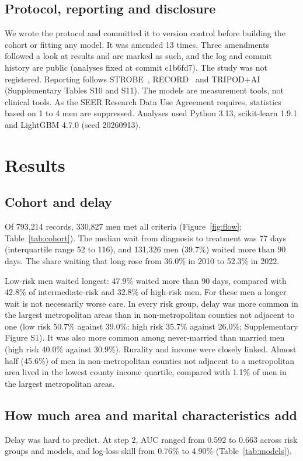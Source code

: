 \documentclass[10pt,a4paper,twocolumn]{article}
\begin{document}
\subsection{Protocol, reporting and disclosure}
We wrote the protocol and committed it to version control before building the cohort or fitting any model. It was amended 13 times. Three amendments followed a look at results and are marked as such, and the log and commit history are public (analyses fixed at commit c1b6fd7). The study was not registered. Reporting follows STROBE~\cite{strobe2007}, RECORD~\cite{record2015} and TRIPOD+AI~\cite{tripodai2024} (Supplementary Tables S10 and S11). The models are measurement tools, not clinical tools. As the SEER Research Data Use Agreement requires, statistics based on 1 to 4 men are suppressed. Analyses used Python 3.13, scikit-learn 1.9.1 and LightGBM 4.7.0 (seed 20260913).

\section{Results}

\subsection{Cohort and delay}
Of 793,214 records, 330,827 men met all criteria (Figure~\ref{fig:flow}; Table~\ref{tab:cohort}). The median wait from diagnosis to treatment was 77 days (interquartile range 52 to 116), and 131,326 men (39.7\%) waited more than 90 days. The share waiting that long rose from 36.0\% in 2010 to 52.3\% in 2022.

Low-risk men waited longest: 47.9\% waited more than 90 days, compared with 42.8\% of intermediate-risk and 32.8\% of high-risk men. For these men a longer wait is not necessarily worse care. In every risk group, delay was more common in the largest metropolitan areas than in non-metropolitan counties not adjacent to one (low risk 50.7\% against 39.0\%; high risk 35.7\% against 26.0\%; Supplementary Figure S1). It was also more common among never-married than married men (high risk 40.0\% against 30.9\%). Rurality and income were closely linked. Almost half (45.6\%) of men in non-metropolitan counties not adjacent to a metropolitan area lived in the lowest county income quartile, compared with 1.1\% of men in the largest metropolitan areas.



\subsection{How much area and marital characteristics add}
Delay was hard to predict. At step 2, AUC ranged from 0.592 to 0.663 across risk groups and models, and log-loss skill from 0.76\% to 4.90\% (Table~\ref{tab:models}).
\end{document}
